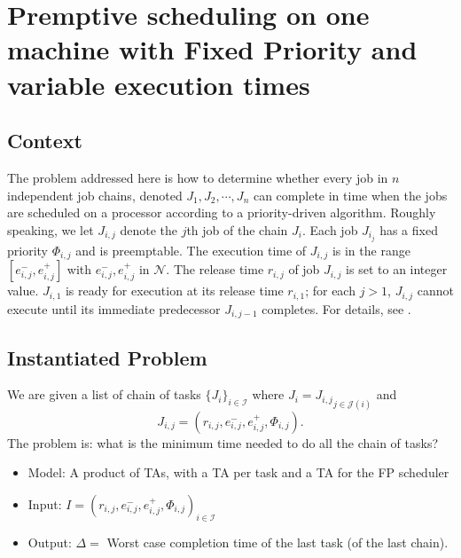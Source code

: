 \documentclass{article}
\begin{document}
\section{Premptive scheduling on one machine with Fixed Priority and variable execution times \cite{sgl97}}
\label{sec:sgl97}
\subsection{Context}
The problem addressed here is how to determine whether every job in $n$ independent job chains, denoted $J_1, J_2, \cdots, J_n$ can complete in time when the jobs are scheduled on a processor according to a 
priority-driven algorithm. Roughly speaking, we let $J_{i,j}$ denote the $j$th job of the chain $J_i$. Each job $J_{i_j}$ has a fixed priority $\Phi_{i,j}$ and is preemptable. The execution time of $J_{i,j}$ is
in the range $[e^{-}_{i,j},e^{+}_{i,j}]$ with $e^{-}_{i,j},e^{+}_{i,j}$ in $\mathcal{N}$. The release time $r_{i,j}$ of job $J_{i,j}$ is set to an integer value. $J_{i,1}$ is ready for execution at its release time $r_{i,1}$; for each $j > 1$, $J_{i,j}$ cannot
execute until its immediate predecessor $J_{i,j-1}$ completes. For details, see \cite{sgl97}. 
% 
% 
\subsection{Instantiated Problem}
We are given a list of chain of tasks $\{J_i\}_{i \in \mathcal{I}}$ where $J_i = {J_{i,j}}_{j \in \mathcal{J}(i)}$ and $$J_{i,j} = (r_{i,j},e^{-}_{i,j},e^{+}_{i,j},\Phi_{i,j}).$$
The problem is: what is the minimum time needed to do all the chain of tasks?
\begin{itemize}
 \item Model: A product of TAs, with a TA per task and a TA for the FP scheduler
 \item Input: $I = (r_{i,j},e^{-}_{i,j},e^{+}_{i,j},\Phi_{i,j})_{i\in \mathcal{I}}$
 \item Output: $\Delta =$ Worst case completion time of the last task (of the last chain).
\end{itemize}
\end{document}
